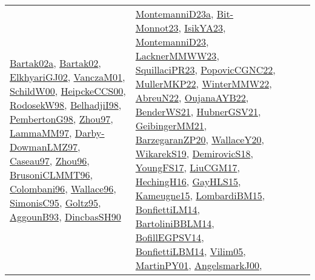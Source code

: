 {\begin{longtable}{lp{3cm}>{\raggedright}p{6cm}>{\raggedright}p{6cm}p{8cm}}
\href{papers/Bartak02a.pdf}{Bartak02a}\cite{Bartak02a}, \href{papers/Bartak02.pdf}{Bartak02}\cite{Bartak02}, \href{papers/ElkhyariGJ02.pdf}{ElkhyariGJ02}\cite{ElkhyariGJ02}, \href{papers/VanczaM01.pdf}{VanczaM01}\cite{VanczaM01}, \href{articles/SchildW00.pdf}{SchildW00}\cite{SchildW00}, \href{articles/HeipckeCCS00.pdf}{HeipckeCCS00}\cite{HeipckeCCS00}, \href{papers/RodosekW98.pdf}{RodosekW98}\cite{RodosekW98}, \href{articles/BelhadjiI98.pdf}{BelhadjiI98}\cite{BelhadjiI98}, \href{papers/PembertonG98.pdf}{PembertonG98}\cite{PembertonG98}, \href{articles/Zhou97.pdf}{Zhou97}\cite{Zhou97}, \href{articles/LammaMM97.pdf}{LammaMM97}\cite{LammaMM97}, \href{articles/Darby-DowmanLMZ97.pdf}{Darby-DowmanLMZ97}\cite{Darby-DowmanLMZ97}, \href{papers/Caseau97.pdf}{Caseau97}\cite{Caseau97}, \href{papers/Zhou96.pdf}{Zhou96}\cite{Zhou96}, \href{papers/BrusoniCLMMT96.pdf}{BrusoniCLMMT96}\cite{BrusoniCLMMT96}, \href{papers/Colombani96.pdf}{Colombani96}\cite{Colombani96}, \href{articles/Wallace96.pdf}{Wallace96}\cite{Wallace96}, \href{papers/SimonisC95.pdf}{SimonisC95}\cite{SimonisC95}, \href{papers/Goltz95.pdf}{Goltz95}\cite{Goltz95}, \href{articles/AggounB93.pdf}{AggounB93}\cite{AggounB93}, \href{articles/DincbasSH90.pdf}{DincbasSH90}\cite{DincbasSH90} & \href{articles/MontemanniD23a.pdf}{MontemanniD23a}\cite{MontemanniD23a}, \href{papers/Bit-Monnot23.pdf}{Bit-Monnot23}\cite{Bit-Monnot23}, \href{articles/IsikYA23.pdf}{IsikYA23}\cite{IsikYA23}, \href{articles/MontemanniD23.pdf}{MontemanniD23}\cite{MontemanniD23}, \href{articles/LacknerMMWW23.pdf}{LacknerMMWW23}\cite{LacknerMMWW23}, \href{papers/SquillaciPR23.pdf}{SquillaciPR23}\cite{SquillaciPR23}, \href{papers/PopovicCGNC22.pdf}{PopovicCGNC22}\cite{PopovicCGNC22}, \href{articles/MullerMKP22.pdf}{MullerMKP22}\cite{MullerMKP22}, \href{papers/WinterMMW22.pdf}{WinterMMW22}\cite{WinterMMW22}, \href{articles/AbreuN22.pdf}{AbreuN22}\cite{AbreuN22}, \href{papers/OujanaAYB22.pdf}{OujanaAYB22}\cite{OujanaAYB22}, \href{papers/BenderWS21.pdf}{BenderWS21}\cite{BenderWS21}, \href{articles/HubnerGSV21.pdf}{HubnerGSV21}\cite{HubnerGSV21}, \href{papers/GeibingerMM21.pdf}{GeibingerMM21}\cite{GeibingerMM21}, \href{papers/BarzegaranZP20.pdf}{BarzegaranZP20}\cite{BarzegaranZP20}, \href{articles/WallaceY20.pdf}{WallaceY20}\cite{WallaceY20}, \href{articles/WikarekS19.pdf}{WikarekS19}\cite{WikarekS19}, \href{papers/DemirovicS18.pdf}{DemirovicS18}\cite{DemirovicS18}, \href{papers/YoungFS17.pdf}{YoungFS17}\cite{YoungFS17}, \href{papers/LiuCGM17.pdf}{LiuCGM17}\cite{LiuCGM17}, \href{papers/HechingH16.pdf}{HechingH16}\cite{HechingH16}, \href{papers/GayHLS15.pdf}{GayHLS15}\cite{GayHLS15}, \href{articles/Kameugne15.pdf}{Kameugne15}\cite{Kameugne15}, \href{papers/LombardiBM15.pdf}{LombardiBM15}\cite{LombardiBM15}, \href{papers/BonfiettiLM14.pdf}{BonfiettiLM14}\cite{BonfiettiLM14}, \href{papers/BartoliniBBLM14.pdf}{BartoliniBBLM14}\cite{BartoliniBBLM14}, \href{papers/BofillEGPSV14.pdf}{BofillEGPSV14}\cite{BofillEGPSV14}, \href{articles/BonfiettiLBM14.pdf}{BonfiettiLBM14}\cite{BonfiettiLBM14}, \href{papers/Vilim05.pdf}{Vilim05}\cite{Vilim05}, \href{articles/MartinPY01.pdf}{MartinPY01}\cite{MartinPY01}, \href{papers/AngelsmarkJ00.pdf}{AngelsmarkJ00}\cite{AngelsmarkJ00}, 
\end{longtable}}
